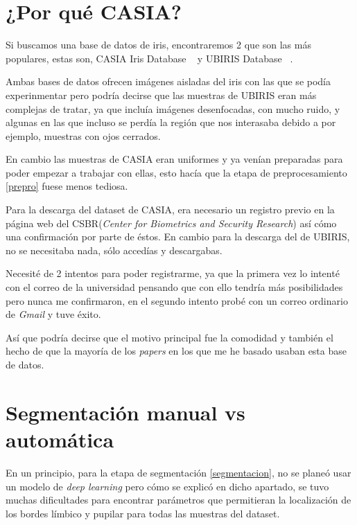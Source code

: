 
\section{¿Por qué CASIA?}

Si buscamos una base de datos de iris, encontraremos 2 que son las más populares, estas son, CASIA Iris Database ~\cite{casia:1} y UBIRIS Database ~\cite{ubiris:1}.

Ambas bases de datos ofrecen imágenes aisladas del iris con las que se podía experinmentar pero podría decirse que las muestras de UBIRIS eran más complejas de tratar, ya que incluía imágenes desenfocadas, con mucho ruido, y algunas en las que incluso se perdía la región que nos interasaba debido a por ejemplo, muestras con ojos cerrados.

En cambio las muestras de CASIA eran uniformes y ya venían preparadas para poder empezar a trabajar con ellas, esto hacía que la etapa de preprocesamiento \ref{prepro} fuese menos tediosa. 

Para la descarga del dataset de CASIA, era necesario un registro previo en la página web del CSBR(\emph{Center for Biometrics and Security Research}) así cómo una confirmación por parte de éstos.
En cambio para la descarga del de UBIRIS, no se necesitaba nada, sólo accedías y descargabas.

Necesité de 2 intentos para poder registrarme, ya que la primera vez lo intenté con el correo de la universidad pensando que con ello tendría más posibilidades pero nunca me confirmaron, en el segundo intento probé con un correo ordinario de \emph{Gmail} y tuve éxito.

Así que podría decirse que el motivo principal fue la comodidad y también el hecho de que la mayoría de los \emph{papers} en los que me he basado usaban esta base de datos.

\section{Segmentación manual vs automática}

En un principio, para la etapa de segmentación \ref{segmentacion}, no se planeó usar un modelo de \emph{deep learning} pero cómo se explicó en dicho apartado, se tuvo muchas dificultades para encontrar parámetros que permitieran la localización de los bordes límbico y pupilar para todas las muestras del dataset.

